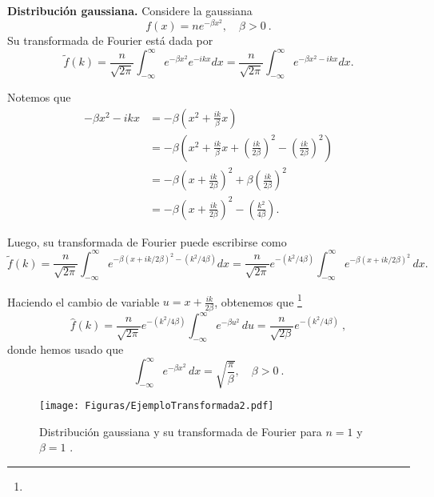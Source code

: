 \begin{ejemplo}
    \textbf{Distribución gaussiana.} Considere la gaussiana
    \begin{equation*}
        f(x) = n e^{-\beta x^2}, \quad  \beta > 0 \ .
    \end{equation*}
    Su transformada de Fourier está dada por 
    \begin{equation*}
        \tilde{f}(k) =  \frac{n}{\sqrt{2\pi}} \int_{-\infty}^{\infty} e^{-\beta x^2} e^{-ikx} dx =  \frac{n}{\sqrt{2\pi}} \int_{-\infty}^{\infty} e^{-\beta x^2-ikx} dx .
    \end{equation*}

    Notemos que 
    \begin{align*}
        -\beta x^2-ikx &= - \beta \left( x^2 + \frac{ik}{\beta}x \right) \\
        &= - \beta \left( x^2 + \frac{ik}{\beta} x + \left( \frac{ik}{2\beta} \right)^2 - \left( \frac{ik}{2\beta} \right)^2 \right) \\
        &= - \beta \left( x + \frac{ik}{2\beta} \right)^2 + \beta \left( \frac{ik}{2\beta} \right)^2 \\
        &= - \beta \left( x + \frac{ik}{2\beta} \right)^2 - \left( \frac{k^2}{4\beta} \right).
    \end{align*}

    Luego, su transformada de Fourier puede escribirse como
    \begin{equation*}
        \tilde{f}(k) =  \frac{n}{\sqrt{2\pi}} \int_{-\infty}^{\infty} e^{-\beta \left( x + ik/2\beta \right)^2 - \left(k^2/4\beta \right)}  dx = \frac{n}{\sqrt{2\pi}} e^{- \left( k^2/4\beta \right)} \int_{-\infty}^{\infty} e^{-\beta \left( x + ik/2\beta \right)^2} \,dx. 
    \end{equation*}

    Haciendo el cambio de variable $u = x + \frac{ik}{2\beta}$, obtenemos que \footnote{}
    \begin{equation}\label{eq:Fourier-Gaussiana}
        \hat{f}(k) = \frac{n}{\sqrt{2\pi}} e^{- \left( k^2/4\beta \right)} \int_{-\infty}^{\infty} e^{-\beta u^2} \, du = \frac{n}{\sqrt{2\beta}} e^{- \left( k^2/4\beta \right)} \ ,
    \end{equation}
    donde hemos usado que 
    \begin{equation}
    \int_{-\infty}^{\infty} e^{-\beta x^2} \,dx = \sqrt{\frac{\pi}{\beta}}, \quad \beta > 0 \ . 
    \end{equation} 

    \begin{figure}[H]
        \centering
        \texttt{[image: Figuras/EjemploTransformada2.pdf]}
        \caption{Distribución gaussiana y su transformada de Fourier para $n=1$ y $\beta =1$ .}
        \label{Espectro3}
    \end{figure}
        \footnoterule
        

\end{ejemplo}
